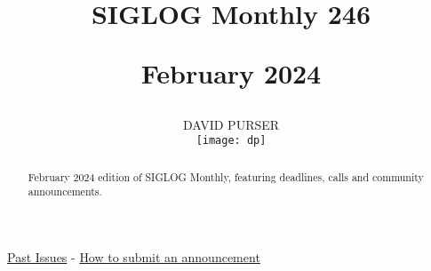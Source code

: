 \documentclass[prodmode,acmtecs]{acmsmall} %
\newcounter{colstart}
\begin{document}
\setcounter{colstart}{\thepage}

\title{{\huge\sc SIGLOG Monthly 246}

 February 2024}
\author{DAVID PURSER
\vspace*{-2.6cm}\begin{flushright}\texttt{[image: dp]}\end{flushright}
}

\begin{abstract}
February 2024 edition of SIGLOG Monthly, featuring deadlines, calls and community announcements.
\end{abstract}


\maketitlee

\href{https://lics.siglog.org/newsletters/}{Past Issues}
 - 
\href{https://lics.siglog.org/newsletters/inst.html}{How to submit an announcement}
\end{document}
